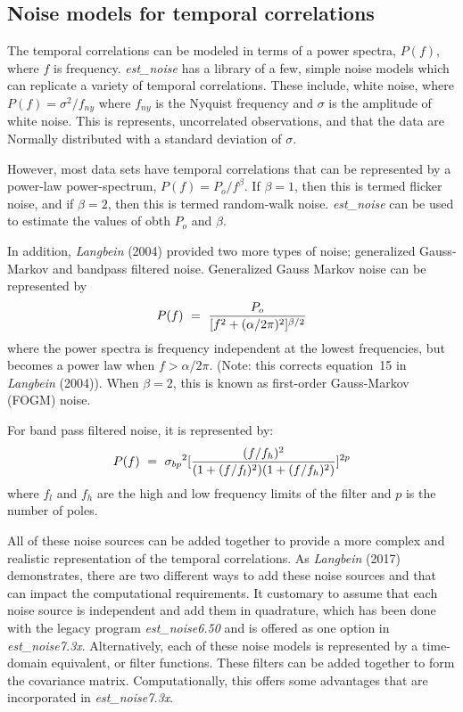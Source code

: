 \documentclass[12pt]{amsart}
\begin{document}
\subsection{Noise models for temporal correlations}

The temporal correlations can be modeled in terms of a power spectra, $P(f)$, where $f$ is frequency. \textit{est\_noise}
has a library of a few, simple noise models which can replicate a variety of temporal correlations. These include,
white noise, where $P(f)={\sigma^2}/f_{ny}$ where $f_{ny}$ is the Nyquist frequency and $\sigma$ is the amplitude
of white noise.  This is represents, uncorrelated observations, and that the data are Normally distributed with a standard
deviation of  $\sigma$.

However, most data sets have temporal correlations that can be represented by a power-law power-spectrum, $P(f)=P_o/f^{\beta}$. If $\beta =1$, then this is termed flicker noise, and if $\beta =2$, then this is termed random-walk noise. \textit{est\_noise} can be used to estimate
the values of obth $P_o$ and $\beta$.

In addition, \textit{Langbein} (2004) provided two more types of noise; generalized Gauss-Markov and bandpass filtered noise.
Generalized Gauss Markov noise can be represented by
\begin{equation}
P(f)~= ~{{P_o} \over [f^2 + ({\alpha}/{2{\pi}})^2]^{{\beta}/2}}
\end{equation}
where the power spectra is frequency independent at the lowest frequencies, but becomes a power law when $f > {\alpha}/{2{\pi}}$. (Note: this corrects equation~15 in \textit{Langbein} (2004)). When $\beta=2$, this is known as first-order Gauss-Markov (FOGM) noise.

For band pass filtered noise, it is represented by:
\begin{equation}
P(f)~= ~{{\sigma_{bp}}^2  [ {{(f/f_h)^2} \over {(1 + (f/f_l)^2)(1 + (f/f_h)^2)} }] ^{2p}}
\end{equation}
where $f_l$ and $f_h$ are the high and low frequency limits of the filter and $p$ is the number of poles.

All of these noise sources can be added together to provide a more complex and realistic representation of the temporal correlations.  As \textit{Langbein} (2017) demonstrates, there are two different ways to add these noise sources and
that can impact the computational requirements.  It customary to assume that each noise source is independent
and add them in quadrature, which has been done with the legacy program \textit{est\_noise6.50} and is offered
as one option in \textit{est\_noise7.3x}.  Alternatively, each of these noise models is represented by
a time-domain equivalent, or filter functions.  These filters can be added together to form the covariance
matrix. Computationally, this offers some advantages that are incorporated in \textit{est\_noise7.3x}.
\end{document}
